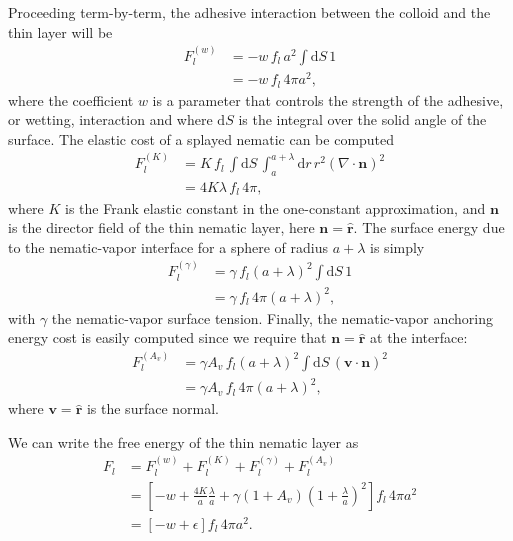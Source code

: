 \documentclass[%
 aip,
 amsmath,amssymb,
 reprint,%
]{revtex4-1}
\begin{document}
Proceeding term-by-term, the adhesive interaction between the colloid and the thin layer will be
\begin{equation}
\begin{split}
F_l^{(w)} &= -w \, f_l \, a^2 \int \textrm{d}S \, 1 \\
 &= -w \, f_l \, 4\pi a^2,
\end{split}
\end{equation}
where the coefficient $w$ is a parameter that controls the strength of the adhesive, or wetting, interaction and where $\textrm{d}S$ is the integral over the solid angle of the surface. The elastic cost of a splayed nematic can be computed
\begin{equation}
\begin{split}
F_l^{(K)} &= K \, f_l \, \int \textrm{d}S \, \int_a^{a+\lambda} \textrm{d} r\, r^2 \left(\nabla \cdot \textbf{n}\right)^2 \\
 &= 4K\lambda \, f_l \, 4\pi ,
 \end{split}
\end{equation}
where $K$ is the Frank elastic constant in the one-constant approximation, and $\textbf{n}$ is the director field of the thin nematic layer, here $\textbf{n} = \hat{\textbf{r}}$. The surface energy due to the nematic-vapor interface for a sphere of radius $a+\lambda$ is simply
\begin{equation}
\begin{split}
F_l^{(\gamma)} &= \gamma \, f_l \left(a + \lambda\right)^2 \int \textrm{d}S \, 1 \\
 &= \gamma \, f_l \, 4\pi \left(a + \lambda\right)^2 ,
\end{split}
\end{equation}
with $\gamma$ the nematic-vapor surface tension. Finally, the nematic-vapor anchoring energy cost is easily computed since we require that $\textbf{n} = \hat{\textbf{r}}$ at the interface:
\begin{equation}
\begin{split}
F_l^{(A_v)} &= \gamma A_v \, f_l \left(a + \lambda\right)^2 \int \textrm{d}S \,  \left(\textbf{v}\cdot\textbf{n}\right)^2 \\
 &=\gamma A_v \, f_l \, 4\pi \left(a + \lambda\right)^2,
\end{split}
\end{equation}
where $\textbf{v} = \hat{\textbf{r}}$ is the surface normal.

We can write the free energy of the thin nematic layer as
\begin{equation}
\begin{split}
F_{l} &= F_l^{(w)} + F_l^{(K)} + F_l^{(\gamma)} + F_l^{(A_v)} \\
 &= \left[-w + \frac{4K}{a}\frac{\lambda}{a} + \gamma\left(1 + A_v\right)\left(1+\frac{\lambda}{a}\right)^2\right] f_{l} \, 4\pi a^2 \\
 &= \left[-w + \epsilon\right] f_{l} \, 4\pi a^2.
\end{split}
\end{equation}
\end{document}

